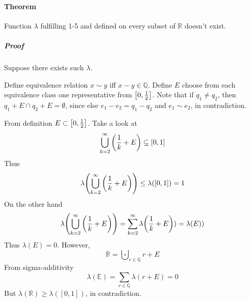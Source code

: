 \paragraph{Theorem} Function $\lambda$ fulfilling 1-5 and defined on every subset of $\mathbb{R}$ doesn't exist.
\subparagraph{Proof}
Suppose there exists such $\lambda$.

Define equivalence relation $x\sim y$ iff $x-y \in \mathbb{Q}$. Define $E$ choose from each equivalence class one representative from $\qty[0, \frac{1}{2}]$. Note that if $q_1\neq q_2$, then $q_1+E \cap q_2 + E = \emptyset$, since else $e_1-e_2=q_1-q_2$ and $e_1\sim e_2$, in contradiction.

From definition $E \subset \qty[0, \frac{1}{2}]$. Take a look at
$$\bigcup_{k=2}^\infty \qty(\frac{1}{k}+E) \subseteq \qty[0,1]$$
Thus
$$\lambda \qty(\bigcup_{k=2}^\infty \qty(\frac{1}{k}+E) ) \leq \lambda\qty([0,1])=1$$
On the other hand
$$\lambda \qty(\bigcup_{k=2}^\infty \qty(\frac{1}{k}+E) ) = \sum_{k=2}^\infty \lambda\qty(\frac{1}{k}+E) ) = \lambda\qty(E) )$$
Thus $\lambda(E)=0$. However, 
$$\mathbb{R} = \bigcupdot_{r\in \mathbb{Q}} r+E$$
From sigma-additivity
$$\lambda(\mathbb{E}) = \sum_{r\in \mathbb{Q}} \lambda(r+E) = 0$$
But $\lambda(\mathbb{R}) \geq \lambda([0,1])$, in contradiction.